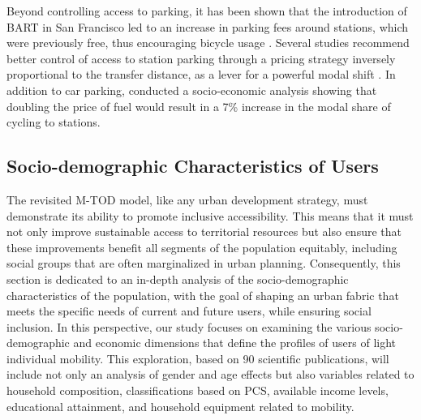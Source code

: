 \begin{refsegment}
Beyond controlling access to parking, it has been shown that the introduction of BART in San Francisco led to an increase in parking fees around stations, which were previously free, thus encouraging bicycle usage \textcolor{blue}{\autocite[94]{cervero_bike-and-ride_2013}}. Several studies recommend better control of access to station parking through a pricing strategy inversely proportional to the transfer distance, as a lever for a powerful modal shift \textcolor{blue}{\autocite[751]{midenet_modal_2018}}. In addition to car parking, \textcolor{blue}{\textcite[2737]{papon_evaluation_2017}} conducted a socio-economic analysis showing that doubling the price of fuel would result in a 7\% increase in the modal share of cycling to stations.%

\subsection{Socio-demographic Characteristics of Users
    \label{chap2:sociodemographie-usagers}
    }

The revisited \acrshort{M-TOD} model, like any urban development strategy, must demonstrate its ability to promote inclusive accessibility. This means that it must not only improve sustainable access to territorial resources but also ensure that these improvements benefit all segments of the population equitably, including social groups that are often marginalized in urban planning. Consequently, this section is dedicated to an in-depth analysis of the socio-demographic characteristics of the population, with the goal of shaping an urban fabric that meets the specific needs of current and future users, while ensuring social inclusion. In this perspective, our study focuses on examining the various socio-demographic and economic dimensions that define the profiles of users of light individual mobility. This exploration, based on 90 scientific publications, will include not only an analysis of gender and age effects but also variables related to household composition, classifications based on \acrshort{PCS}, available income levels, educational attainment, and household equipment related to mobility.%


\end{refsegment}
